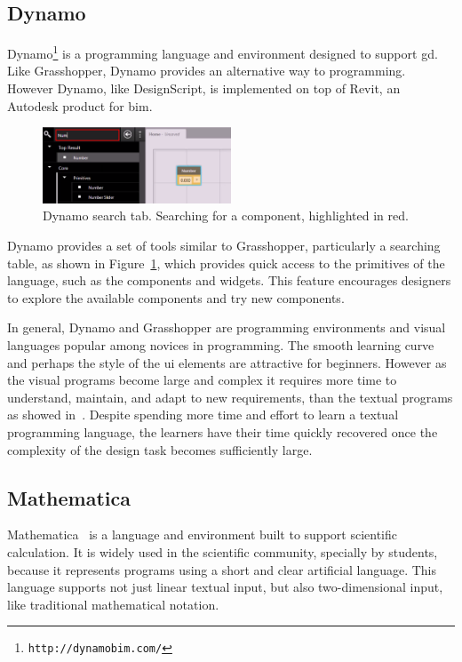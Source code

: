 \subsection{Dynamo}
\label{subsed:dynamo}
Dynamo\footnote{\texttt{http://dynamobim.com/}} is a programming language and environment designed to support \gls{gd}. Like Grasshopper, Dynamo provides an alternative way to programming. However Dynamo, like DesignScript, is implemented on top of Revit, an Autodesk product for \gls{bim}.

\begin{figure}
  \begin{center}
    \includegraphics[width=0.5\textwidth]{images/dynam-tab}
  \end{center}
 \caption{Dynamo search tab. Searching for a component, highlighted in red.}  
    \label{fig:dynam}
\end{figure}

Dynamo provides a set of tools similar to Grasshopper, particularly a searching table, as shown in Figure~\ref{fig:dynam}, which provides quick access to the primitives of the language, such as the components and widgets. This feature encourages designers to explore the available components and try new components.

In general, Dynamo and Grasshopper are programming environments and visual languages popular among novices in programming. The smooth learning curve and perhaps the style of the \gls{ui} elements are attractive for beginners. However as the visual programs become large and complex it requires more time to understand, maintain, and adapt to new requirements, than the textual programs as showed in~\citep{leitao2011programming}. Despite spending more time and effort to learn a textual programming language, the learners have their time quickly recovered once the complexity of the design task becomes sufficiently large.
\subsection{Mathematica}
\label{subsec:mathematica}
Mathematica~\citep{wolfram1991mathematica} is a language and environment built to support scientific calculation. It is widely used in the scientific community, specially by students, because it represents programs using a short and clear artificial language. This language supports not just linear textual input, but also two-dimensional input, like traditional mathematical notation.


